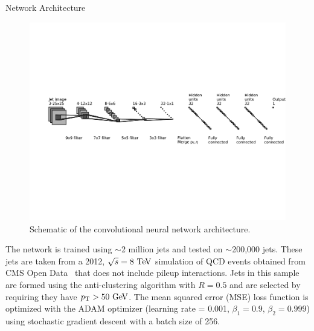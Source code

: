 \begin{section}{Network Architecture}
\begin{figure}[tbp!]
\begin{center}
\includegraphics[angle=0,width=0.95\columnwidth]{fig/cnn_arch.pdf}
\end{center}
\caption{Schematic of the convolutional neural network architecture.}
\label{fig:cnn_arch}
\end{figure}

The network is trained using $\sim$2 million jets and tested on $\sim$200,000 jets. 
These jets are taken from a 2012, $\sqrt{s} = 8~\mathrm{Te\kern -0.1em V}$ simulation of QCD events obtained from CMS Open Data~\cite{cms_opendata} that does not include pileup interactions.
Jets in this sample are formed using the anti-\kT clustering algorithm with $R = 0.5$ and are selected by requiring they have $p_{\mathrm{T}} > 50~\mathrm{Ge\kern -0.1em V}$.
The mean squared error (MSE) loss function is optimized with the ADAM optimizer (learning rate = 0.001, $\beta_1 = 0.9$, $\beta_2 = 0.999$) using stochastic gradient descent with a batch size of 256.

\end{section}

